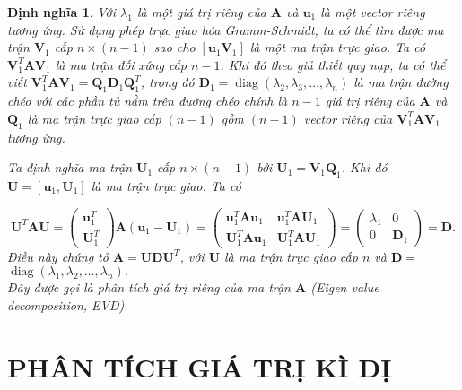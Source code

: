 \documentclass[12pt,a4paper,oneside]{report}
\newtheorem{dn}{Định nghĩa}[section]
\numberwithin{equation}{section}
\begin{document}
\begin{dn}
	Với $\lambda_{1}$ là một giá trị riêng của $\mathbf{A}$ và $\mathbf{u}_{1}$ là một vector riêng tương ứng. Sử dụng phép trực giao hóa Gramm-Schmidt, ta có thể tìm được ma trận $\mathbf{V}_{1}$ cấp $n \times(n-1)$ sao cho $\left[\mathbf{u}_{1} \mathbf{V}_{1}\right]$ là một ma trận trực giao. Ta có $\mathbf{V}_{1}^{T} \mathbf{A} \mathbf{V}_{1}$ là ma trận đối xứng cấp $n-1$. Khi đó theo giả thiết quy nạp, ta có thể viết $\mathbf{V}_{1}^{T} \mathbf{A} \mathbf{V}_{1}=\mathbf{Q}_{1} \mathbf{D}_{1} \mathbf{Q}_{1}^{T}$, trong đó $\mathbf{D}_{1}=\operatorname{diag}\left(\lambda_{2}, \lambda_{3}, \ldots, \lambda_{n}\right)$ là ma trận đường chéo với các phần tử nằm trên đường chéo chính là $n-1$ giá trị riêng của $\mathbf{A}$ và $\mathbf{Q}_{1}$ là ma trận trực giao cấp $(n-1)$ gồm $(n-1)$ vector riêng của $\mathbf{V}_{1}^{T} \mathbf{A} \mathbf{V}_{1}$ tương ứng.
	
	Ta định nghĩa ma trận $\mathbf{U}_{1}$ cấp $n \times(n-1)$ bởi $\mathbf{U}_{1}=\mathbf{V}_{1} \mathbf{Q}_{1}$. Khi đó $\mathbf{U}=\left[\mathbf{u}_{1}, \mathbf{U}_{1}\right]$ là ma trận trực giao. Ta có
	
	$$
	\mathbf{U}^{T} \mathbf{A} \mathbf{U}=\left(\begin{array}{c}
		\mathbf{u}_{1}^{T} \\
		\mathbf{U}_{1}^{T}
	\end{array}\right) \mathbf{A}\left(\mathbf{u}_{1}-\mathbf{U}_{1}\right)=\left(\begin{array}{cc}
		\mathbf{u}_{1}^{T} \mathbf{A} \mathbf{u}_{1} & \mathbf{u}_{1}^{T} \mathbf{A} \mathbf{U}_{1} \\
		\mathbf{U}_{1}^{T} \mathbf{A} \mathbf{u}_{1} & \mathbf{U}_{1}^{T} \mathbf{A} \mathbf{U}_{1}
	\end{array}\right)=\left(\begin{array}{cc}
		\lambda_{1} & 0 \\
		0 & \mathbf{D}_{1}
	\end{array}\right)=\mathbf{D} .
	$$
	Điều này chứng tỏ $\mathbf{A}=\mathbf{U D U}^{T}$, với $\mathbf{U}$ là ma trận trực giao cấp $n$ và $\mathbf{D}=$ $\operatorname{diag}\left(\lambda_{1}, \lambda_{2}, \ldots, \lambda_{n}\right).$\\
	
	Đây được gọi là phân tích giá trị riêng của ma trận $\mathbf{A}$ (Eigen value decomposition, EVD). 

\end{dn}

\chapter{ PHÂN TÍCH GIÁ TRỊ KÌ DỊ }
\end{document}
